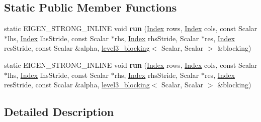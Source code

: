 \subsection*{Static Public Member Functions}
\begin{DoxyCompactItemize}
\item 
\mbox{\label{struct_eigen_1_1internal_1_1product__selfadjoint__matrix_3_01_scalar_00_01_index_00_01_lhs_stora8fa4562df6c92574330a318a01a976cf_a89235ec4b62047a8d2f93d7ee75954f6}} 
static E\+I\+G\+E\+N\+\_\+\+S\+T\+R\+O\+N\+G\+\_\+\+I\+N\+L\+I\+NE void {\bfseries run} (\hyperlink{namespace_eigen_a62e77e0933482dafde8fe197d9a2cfde}{Index} rows, \hyperlink{namespace_eigen_a62e77e0933482dafde8fe197d9a2cfde}{Index} cols, const Scalar $\ast$lhs, \hyperlink{namespace_eigen_a62e77e0933482dafde8fe197d9a2cfde}{Index} lhs\+Stride, const Scalar $\ast$rhs, \hyperlink{namespace_eigen_a62e77e0933482dafde8fe197d9a2cfde}{Index} rhs\+Stride, Scalar $\ast$res, \hyperlink{namespace_eigen_a62e77e0933482dafde8fe197d9a2cfde}{Index} res\+Stride, const Scalar \&alpha, \hyperlink{class_eigen_1_1internal_1_1level3__blocking}{level3\+\_\+blocking}$<$ Scalar, Scalar $>$ \&blocking)
\item 
\mbox{\label{struct_eigen_1_1internal_1_1product__selfadjoint__matrix_3_01_scalar_00_01_index_00_01_lhs_stora8fa4562df6c92574330a318a01a976cf_a89235ec4b62047a8d2f93d7ee75954f6}} 
static E\+I\+G\+E\+N\+\_\+\+S\+T\+R\+O\+N\+G\+\_\+\+I\+N\+L\+I\+NE void {\bfseries run} (\hyperlink{namespace_eigen_a62e77e0933482dafde8fe197d9a2cfde}{Index} rows, \hyperlink{namespace_eigen_a62e77e0933482dafde8fe197d9a2cfde}{Index} cols, const Scalar $\ast$lhs, \hyperlink{namespace_eigen_a62e77e0933482dafde8fe197d9a2cfde}{Index} lhs\+Stride, const Scalar $\ast$rhs, \hyperlink{namespace_eigen_a62e77e0933482dafde8fe197d9a2cfde}{Index} rhs\+Stride, Scalar $\ast$res, \hyperlink{namespace_eigen_a62e77e0933482dafde8fe197d9a2cfde}{Index} res\+Stride, const Scalar \&alpha, \hyperlink{class_eigen_1_1internal_1_1level3__blocking}{level3\+\_\+blocking}$<$ Scalar, Scalar $>$ \&blocking)
\end{DoxyCompactItemize}


\subsection{Detailed Description}
